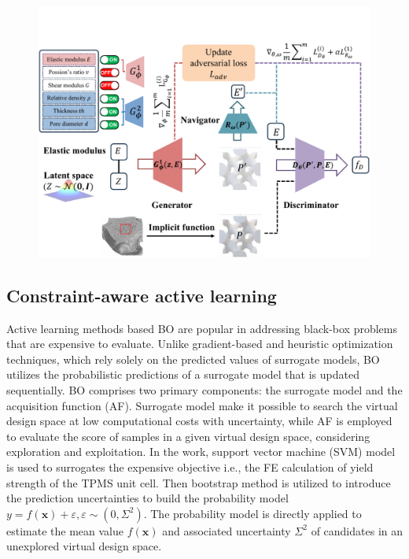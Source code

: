 \documentclass[preprint,review,12pt,authoryear]{elsarticle}
\begin{document}
\begin{figure}
    \centering
    \includegraphics[width=1\linewidth]{figures/3.pdf}        
    \label{fig:2}
\end{figure}
  
\subsection{Constraint-aware active learning}
\label{sec:2-4}
Active learning methods based BO are popular in addressing black-box problems that are expensive to evaluate. Unlike gradient-based and heuristic optimization techniques, which rely solely on the predicted values of surrogate models, BO utilizes the probabilistic predictions of a surrogate model that is updated sequentially. BO comprises two primary components: the surrogate model and the acquisition function (AF). Surrogate model make it possible to search the virtual design space at low computational costs with uncertainty, while AF is employed to evaluate the score of samples in a given virtual design space, considering exploration and exploitation. In the work, support vector machine (SVM) model is used to surrogates the expensive objective i.e., the FE calculation of yield strength of the TPMS unit cell. Then bootstrap method is utilized to introduce the prediction uncertainties to build the probability model $y=f(\boldsymbol{x})+\varepsilon,\varepsilon\sim(0, \Sigma^2)$. The probability model is directly applied to estimate the mean value $f(\boldsymbol{x})$ and associated uncertainty $\Sigma^2$ of candidates in an unexplored virtual design space.
\end{document}
